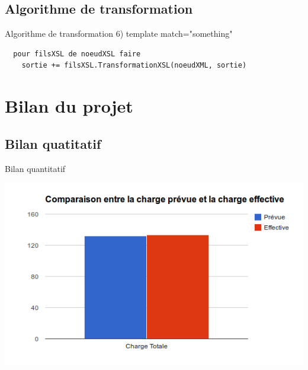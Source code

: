 \documentclass[aspectratio=169]{beamer}
\begin{document}
\subsection{Algorithme de transformation}
\begin{frame}[fragile]{Algorithme de transformation}
 6) template match="something"
 \scriptsize
 \begin{verbatim}
  pour filsXSL de noeudXSL faire
    sortie += filsXSL.TransformationXSL(noeudXML, sortie)
 \end{verbatim}
\normalsize
\end{frame}

\section{Bilan du projet}
\subsection{Bilan quatitatif}
\begin{frame}{Bilan quantitatif}
\begin{center}
 \includegraphics[scale=0.5]{chargetot}
\end{center}
\end{frame}
\end{document}
